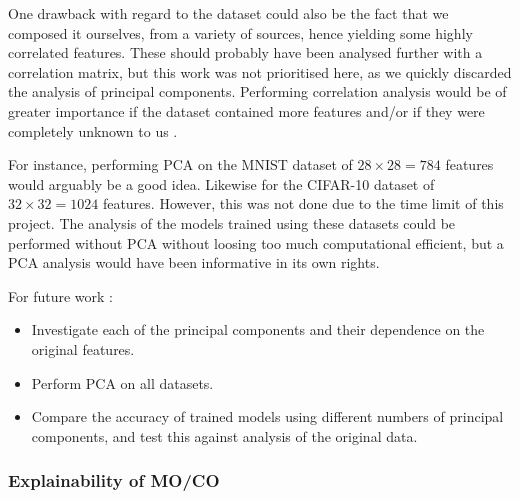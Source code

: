     One drawback with regard to the dataset could also be the fact that we composed it ourselves, from a variety of sources, hence yielding some highly correlated features. These should probably have been analysed further with a correlation matrix, but this work was not prioritised here, as we quickly discarded the analysis of principal components. Performing correlation analysis would be of greater importance if the dataset contained more features and/or if they were completely unknown to us . 

    For instance, performing PCA on the MNIST dataset of $28\times 28 = 784$ features would arguably be a good idea. Likewise for the CIFAR-10 dataset of $32\times 32 = 1024$ features. However, this was not done due to the time limit of this project. The analysis of the models trained using these datasets could be performed without PCA without loosing too much  computational efficient, but a PCA analysis would have been  informative in its own rights. 
    
    For future work :
    \begin{itemize}
        \item Investigate each of the principal components and their dependence on the original features. 
        \item Perform PCA on all datasets. 
        \item Compare the accuracy of trained models using different numbers of principal components, and test this against analysis of the original data. 
    \end{itemize}


    

\subsubsection{Explainability of MO/CO}



